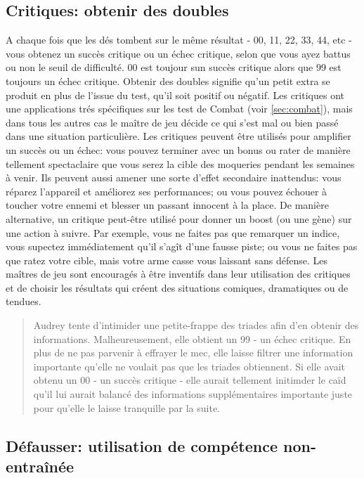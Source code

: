 \subsection{Critiques: obtenir des doubles} \label{sec:crit-roll-doubl} 

A chaque fois que les dés tombent sur le même résultat - 00, 11, 22, 33, 44, etc - vous obtenez un succès critique ou un échec critique, selon que vous ayez battus ou non le seuil de difficulté. 00 est toujour sun succès critique alors que 99 est toujours un échec critique. Obtenir des doubles signifie qu'un petit extra se produit en plus de l'issue du test, qu'il soit positif ou négatif. Les critiques ont une applications trés spécifiques sur les test de Combat (voir \ref{sec:combat}), mais dans tous les autres cas le maître de jeu décide ce qui s'est mal ou bien passé dans une situation particulière. Les critiques peuvent être utilisés pour amplifier un succès ou un échec: vous pouvez terminer avec un bonus ou rater de manière tellement spectaclaire que vous serez la cible des moqueries pendant les semaines à venir. Ils peuvent aussi amener une sorte d'effet secondaire inattendus: vous réparez l'appareil et améliorez ses performances; ou vous pouvez échouer à toucher votre ennemi et blesser un passant innocent à la place. De manière alternative, un critique peut-être utilisé pour donner un boost (ou une gène) sur une action à suivre. Par exemple, vous ne faites pas que remarquer un indice, vous supectez immédiatement qu'il s'agît d'une fausse piste; ou vous ne faites pas que ratez votre cible, mais votre arme casse vous laissant sans défense. Les maîtres de jeu sont encouragés à être inventifs dans leur utilisation des critiques et de choisir les résultats qui créent des situations comiques, dramatiques ou de tendues. 

\begin{quotation} Audrey tente d'intimider une petite-frappe des triades afin d'en obtenir des informations. Malheureusement, elle obtient un 99 - un échec critique. En plus de ne pas parvenir à effrayer le mec, elle laisse filtrer une information importante qu'elle ne voulait pas que les triades obtiennent. Si elle avait obtenu un 00 - un succès critique - elle aurait tellement initimder le caïd qu'il lui aurait balancé des informations supplémentaires importante juste pour qu'elle le laisse tranquille par la suite. \end{quotation} 

\subsection{Défausser: utilisation de compétence non-entraînée} \label{sec:defa-untr-skill} 

